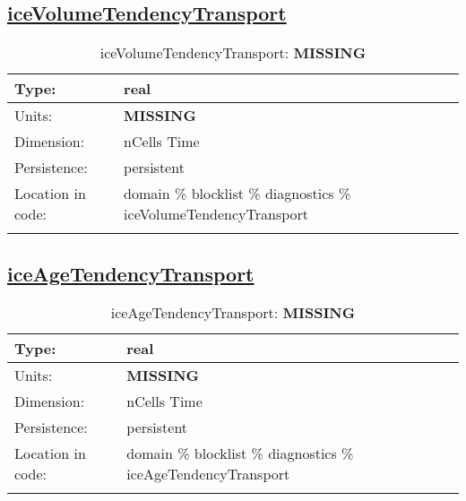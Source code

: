 \subsection[iceVolumeTendencyTransport]{\hyperref[sec:var_tab_diagnostics]{iceVolumeTendencyTransport}}
\label{subsec:var_sec_diagnostics_iceVolumeTendencyTransport}
\begin{center}
\begin{longtable}{| p{2.0in} | p{4.0in} |}
        \hline 
        Type: & real \\
        \hline 
        Units: & {\bf \color{red} MISSING} \\
        \hline 
        Dimension: & nCells Time \\
        \hline 
        Persistence: & persistent \\
        \hline 
         Location in code: & domain \% blocklist \% diagnostics \% iceVolumeTendencyTransport \\
         \hline 
    \caption{iceVolumeTendencyTransport: {\bf \color{red} MISSING}}
\end{longtable}
\end{center}
\subsection[iceAgeTendencyTransport]{\hyperref[sec:var_tab_diagnostics]{iceAgeTendencyTransport}}
\label{subsec:var_sec_diagnostics_iceAgeTendencyTransport}
\begin{center}
\begin{longtable}{| p{2.0in} | p{4.0in} |}
        \hline 
        Type: & real \\
        \hline 
        Units: & {\bf \color{red} MISSING} \\
        \hline 
        Dimension: & nCells Time \\
        \hline 
        Persistence: & persistent \\
        \hline 
         Location in code: & domain \% blocklist \% diagnostics \% iceAgeTendencyTransport \\
         \hline 
    \caption{iceAgeTendencyTransport: {\bf \color{red} MISSING}}
\end{longtable}
\end{center}

